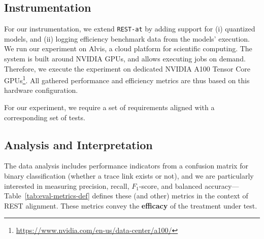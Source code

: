 \documentclass[conference]{IEEEtran}
\begin{document}
\subsection{Instrumentation}\label{sec:instrumentation}

For our instrumentation, we extend \verb|REST-at| by adding support for (i) quantized models, and (ii) logging efficiency benchmark data from the models' execution. We run our experiment on Alvis, a cloud platform for scientific computing. The system is built around NVIDIA GPUs, and allows executing jobs on demand. Therefore, we execute the experiment on dedicated NVIDIA A100 Tensor Core GPUs\footnote{\url{https://www.nvidia.com/en-us/data-center/a100/}}. All gathered performance and efficiency metrics are thus based on this hardware configuration.

For our experiment, we require a set of requirements aligned with a corresponding set of tests. 

\subsection{Analysis and Interpretation}\label{sec:analysis}

The data analysis includes performance indicators from a confusion matrix for binary classification (whether a trace link exists or not), and we are particularly interested in measuring precision, recall, $F_1$-score, and balanced accuracy---Table~\ref{tab:eval-metrics-def} defines these (and other) metrics in the context of REST alignment. These metrics convey the \textbf{efficacy} of the treatment under test. 
\end{document}
